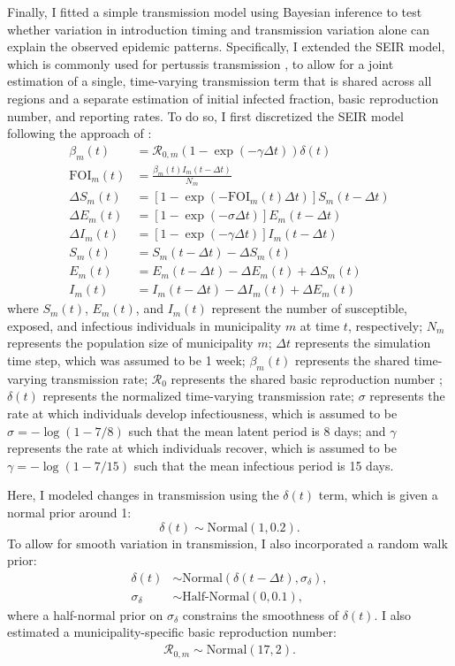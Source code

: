 \documentclass[12pt]{article}
\begin{document}
Finally, I fitted a simple transmission model using Bayesian inference to test whether variation in introduction timing and transmission variation alone can explain the observed epidemic patterns.
Specifically, I extended the SEIR model, which is commonly used for pertussis transmission \citep{rohani2010contact}, to allow for a joint estimation of a single, time-varying transmission term that is shared across all regions and a separate estimation of initial infected fraction, basic reproduction number, and reporting rates.
To do so, I first discretized the SEIR model following the approach of \cite{he2010plug}:
\begin{align}
\beta_m (t) &= \mathcal R_{0,m} (1-\exp(-\gamma\Delta t)) \delta(t)\\
\textrm{FOI}_m(t) &= \frac{\beta_m (t) I_m(t-\Delta t)}{N_m}\\
\Delta S_m(t) &= \left[1- \exp(-\textrm{FOI}_m(t) \Delta t)\right] S_m(t-\Delta t)\\
\Delta E_m(t) &= \left[1- \exp(-\sigma \Delta t)\right] E_m(t-\Delta t)\\
\Delta I_m(t) &= \left[1- \exp(-\gamma \Delta t)\right] I_m(t-\Delta t)\\
S_m(t) &= S_m(t-\Delta t) -\Delta S_m(t)\\
E_m(t) &= E_m(t-\Delta t) -\Delta E_m(t) + \Delta S_m(t)\\
I_m(t) &= I_m(t-\Delta t) -\Delta I_m(t) + \Delta E_m(t)
\end{align}
where $S_m(t)$, $E_m(t)$, and $I_m(t)$ represent the number of susceptible, exposed, and infectious individuals in municipality $m$ at time $t$, respectively;
$N_m$ represents the population size of municipality $m$;
$\Delta t$ represents the simulation time step, which was assumed to be 1 week;
$\beta_m (t)$ represents the shared time-varying transmission rate;
$\mathcal R_0$ represents the shared basic reproduction number \citep{anderson1991infectious};
$\delta(t)$ represents the normalized time-varying transmission rate;
$\sigma$ represents the rate at which individuals develop infectiousness, which is assumed to be $\sigma=-\log(1-7/8)$ such that the mean latent period is 8 days;
and $\gamma$ represents the rate at which individuals recover, which is assumed to be $\gamma=-\log(1-7/15)$ such that the mean infectious period is 15 days.

Here, I modeled changes in transmission using the $\delta(t)$ term, which is given a normal prior around 1:
\begin{equation}
\delta(t) \sim \mathrm{Normal}(1, 0.2).
\end{equation}
To allow for smooth variation in transmission, I also incorporated a random walk prior:
\begin{align}
\delta(t) &\sim \mathrm{Normal}(\delta(t-\Delta t), \sigma_\delta),\\
\sigma_\delta &\sim \textrm{Half-Normal}(0, 0.1),
\end{align}
where a half-normal prior on $\sigma_\delta$ constrains the smoothness of $\delta(t)$.
I also estimated a municipality-specific basic reproduction number:
\begin{align}
\mathcal R_{0,m} \sim \mathrm{Normal}(17, 2).
\end{align}
\end{document}

